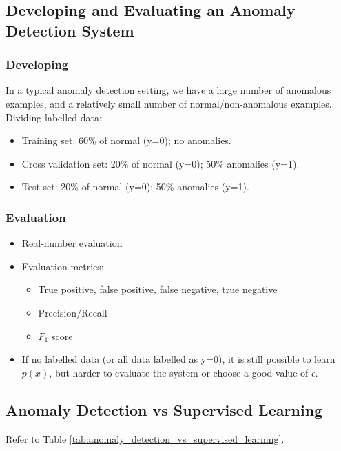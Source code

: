     \subsection{Developing and Evaluating an Anomaly Detection System}
        \subsubsection{Developing}
            In a typical anomaly detection setting, we have a large number of anomalous examples, and a relatively small number of normal/non-anomalous examples.
            Dividing labelled data:
            \begin{itemize}
                \item Training set: 60\% of normal (y=0); no anomalies.
                \item Cross validation set: 20\% of normal (y=0); 50\% anomalies (y=1).
                \item Test set: 20\% of normal (y=0); 50\% anomalies (y=1).
            \end{itemize}
            
        \subsubsection{Evaluation}
            \begin{itemize}
                \item Real-number evaluation
                \item Evaluation metrics: 
                    \begin{itemize}
                        \item True positive, false positive, false negative, true negative
                        \item Precision/Recall
                        \item $F_1$ score
                    \end{itemize}
                \item If no labelled data (or all data labelled as y=0), it is still possible to learn $p(x)$, but harder to evaluate the system or choose a good value of $\epsilon$.
            \end{itemize}
    
    \subsection{Anomaly Detection vs Supervised Learning}
    Refer to Table \ref{tab:anomaly_detection_vs_supervised_learning}. 

